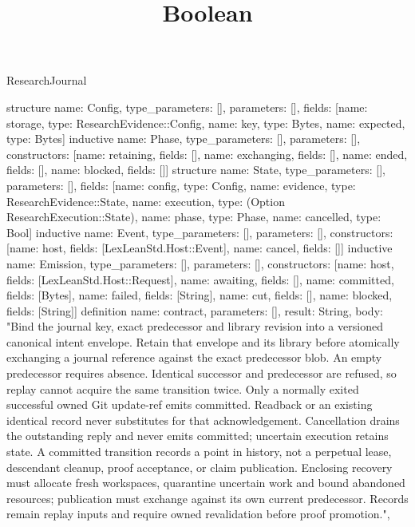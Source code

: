 \begin{lexlean}{ResearchJournal}
\title{Boolean}
\begin{semanticmodule}
structure{
 name: Config,
 type_parameters: [],
 parameters: [],
 fields: [{name: storage, type: ResearchEvidence::Config}, {name: key, type: Bytes}, {name: expected, type: Bytes}]
}
inductive{
 name: Phase,
 type_parameters: [],
 parameters: [],
 constructors: [{name: retaining, fields: []}, {name: exchanging, fields: []}, {name: ended, fields: []}, {name: blocked, fields: []}]
}
structure{
 name: State,
 type_parameters: [],
 parameters: [],
 fields: [{name: config, type: Config}, {name: evidence, type: ResearchEvidence::State}, {name: execution, type: (Option ResearchExecution::State)}, {name: phase, type: Phase}, {name: cancelled, type: Bool}]
}
inductive{
 name: Event,
 type_parameters: [],
 parameters: [],
 constructors: [{name: host, fields: [LexLeanStd.Host::Event]}, {name: cancel, fields: []}]
}
inductive{
 name: Emission,
 type_parameters: [],
 parameters: [],
 constructors: [{name: host, fields: [LexLeanStd.Host::Request]}, {name: awaiting, fields: []}, {name: committed, fields: [Bytes]}, {name: failed, fields: [String]}, {name: cut, fields: []}, {name: blocked, fields: [String]}]
}
definition{
 name: contract,
 parameters: [],
 result: String,
 body: "Bind the journal key, exact predecessor and library revision into a versioned canonical intent envelope. Retain that envelope and its library before atomically exchanging a journal reference against the exact predecessor blob. An empty predecessor requires absence. Identical successor and predecessor are refused, so replay cannot acquire the same transition twice. Only a normally exited successful owned Git update-ref emits committed. Readback or an existing identical record never substitutes for that acknowledgement. Cancellation drains the outstanding reply and never emits committed; uncertain execution retains state. A committed transition records a point in history, not a perpetual lease, descendant cleanup, proof acceptance, or claim publication. Enclosing recovery must allocate fresh workspaces, quarantine uncertain work and bound abandoned resources; publication must exchange against its own current predecessor. Records remain replay inputs and require owned revalidation before proof promotion.",
}
\end{semanticmodule}
\end{lexlean}
